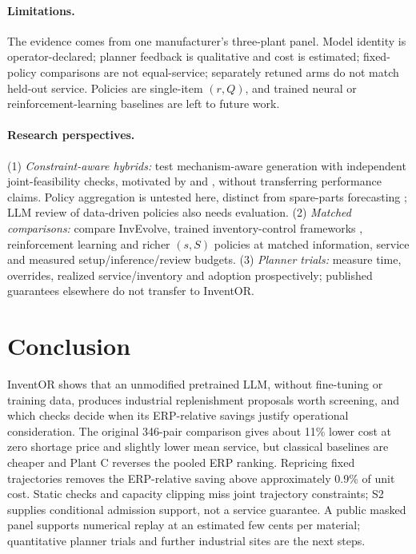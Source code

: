 \documentclass[preprint,12pt,nonatbib]{elsarticle}
\let\cite\parencite
\begin{document}
\paragraph{Limitations.}
The evidence comes from one manufacturer's three-plant panel. Model identity is operator-declared; planner feedback is qualitative and cost is estimated; fixed-policy comparisons are not equal-service; separately retuned arms do not match held-out service. Policies are single-item $(r,Q)$, and trained neural or reinforcement-learning baselines are left to future work.

\paragraph{Research perspectives.}
(1) \emph{Constraint-aware hybrids:} test mechanism-aware generation with independent joint-feasibility checks, motivated by \cite{yan2026mechanism} and \cite{dehghani2026simgpt}, without transferring performance claims. Policy aggregation is untested here, distinct from spare-parts forecasting \cite{nakhost2025copilot}; LLM review of data-driven policies \cite{wasserkrug2025enhancing} also needs evaluation. (2) \emph{Matched comparisons:} compare InvEvolve, trained inventory-control frameworks \cite{gabellini2026novel}, reinforcement learning \cite{kolyaei2025rl, stranieri2024drl} and richer $(s,S)$ policies \cite{prak2021robust, babai2026fifty} at matched information, service and measured setup/inference/review budgets. (3) \emph{Planner trials:} measure time, overrides, realized service/inventory and adoption \cite{venkatesh2023adoption, cannas2023aiscm, trifone2026agentic} prospectively; published guarantees elsewhere do not transfer to InventOR.

\section{Conclusion}
\label{sec:conclusion}
InventOR shows that an unmodified pretrained LLM, without fine-tuning or training data, produces industrial replenishment proposals worth screening, and which checks decide when its ERP-relative savings justify operational consideration. The original 346-pair comparison gives about 11\% lower cost at zero shortage price and slightly lower mean service, but classical baselines are cheaper and Plant C reverses the pooled ERP ranking. Repricing fixed trajectories removes the ERP-relative saving above approximately 0.9\% of unit cost. Static checks and capacity clipping miss joint trajectory constraints; S2 supplies conditional admission support, not a service guarantee. A public masked panel supports numerical replay at an estimated few cents per material; quantitative planner trials and further industrial sites are the next steps.
\end{document}
